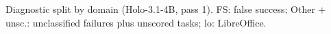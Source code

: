 \begin{table}[h]
\centering\small

\caption{Diagnostic split by domain (Holo-3.1-4B, pass 1). FS: false success; Other + unsc.: unclassified failures plus unscored tasks; lo: LibreOffice.}
\label{tab:osw-domains}
\end{table}
